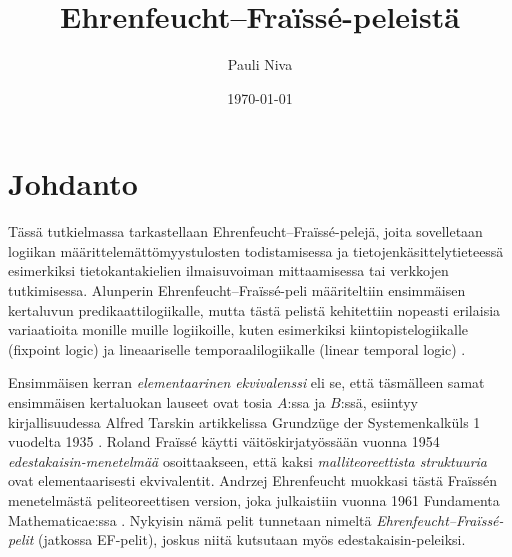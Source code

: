 \documentclass[finnish]{tktltiki2}
\title{Ehrenfeucht--Fraïssé-peleistä}
\author{Pauli Niva}
\date{\today}
\theoremstyle{definition}
\theoremstyle{remark}
\begin{document}

\frontmatter      %

\maketitle        %
\makeabstract     %

\tableofcontents  %


\mainmatter       %

\section{Johdanto}

Tässä tutkielmassa tarkastellaan Ehrenfeucht--Fraïssé-pelejä, joita sovelletaan logiikan määrittelemättömyystulosten todistamisessa ja tietojenkäsittelytieteessä esimerkiksi tietokantakielien ilmaisuvoiman mittaamisessa tai verkkojen tutkimisessa. Alunperin Ehrenfeucht--Fraïssé-peli määriteltiin ensimmäisen kertaluvun predikaattilogiikalle, mutta tästä pelistä kehitettiin nopeasti erilaisia variaatioita monille muille logiikoille, kuten esimerkiksi kiintopistelogiikalle (fixpoint logic) \cite{Bos93} ja lineaariselle temporaalilogiikalle (linear temporal logic) \cite{Ete96}.

Ensimmäisen kerran \textit{elementaarinen ekvivalenssi} eli se, että täsmälleen samat ensimmäisen kertaluokan lauseet ovat tosia $A$:ssa ja $B$:ssä, esiintyy kirjallisuudessa Alfred Tarskin artikkelissa Grundzüge der Systemenkalküls 1 vuodelta 1935 \cite{Tar35}. Roland Fraïssé käytti väitöskirjatyössään \cite{Fra54} vuonna 1954 \textit{edestakaisin-menetelmää} osoittaakseen, että kaksi \textit{malliteoreettista struktuuria} ovat elementaarisesti ekvivalentit. Andrzej Ehrenfeucht muokkasi tästä Fraïssén menetelmästä peliteoreettisen version, joka julkaistiin vuonna 1961 Fundamenta Mathematicae:ssa \cite{Ehr61}. Nykyisin nämä pelit tunnetaan nimeltä \textit{Ehrenfeucht--Fraïssé-pelit} (jatkossa EF-pelit), joskus niitä kutsutaan myös edestakaisin-peleiksi.
\end{document}
